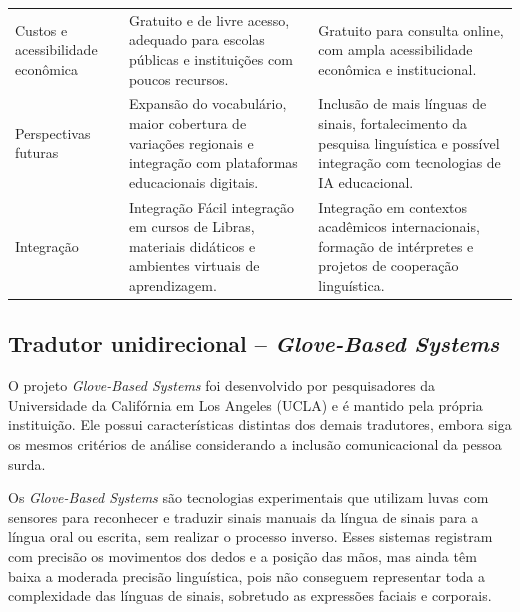 \documentclass[portuguese]{textolivre}
\begin{document}
\begin{table}[htbp]
\begin{threeparttable}
\begin{tabularx}{\textwidth}{@{}>{\raggedright\arraybackslash}p{2.5cm}
>{\raggedright\arraybackslash}X
>{\raggedright\arraybackslash}X@{}}
\addlinespace

Custos e acessibilidade econômica &
Gratuito e de livre acesso, adequado para escolas públicas e instituições com poucos recursos. &
Gratuito para consulta online, com ampla acessibilidade econômica e institucional. \\

\addlinespace

Perspectivas futuras &
Expansão do vocabulário, maior cobertura de variações regionais e integração com plataformas educacionais digitais. &
Inclusão de mais línguas de sinais, fortalecimento da pesquisa linguística e possível integração com tecnologias de IA educacional. \\

\addlinespace

Integração &
Integração Fácil integração em cursos de Libras, materiais didáticos e ambientes virtuais de aprendizagem. &
Integração em contextos acadêmicos internacionais, formação de intérpretes e projetos de cooperação linguística. \\

\bottomrule

\end{tabularx}
\end{threeparttable}
\end{table}

\subsection{Tradutor unidirecional – \textit{Glove-Based Systems}}

O projeto \textit{Glove-Based Systems} foi desenvolvido por pesquisadores da Universidade da Califórnia em Los Angeles (UCLA) e é mantido pela própria instituição. Ele possui características distintas dos demais tradutores, embora siga os mesmos critérios de análise considerando a inclusão comunicacional da pessoa surda.

Os \textit{Glove-Based Systems} são tecnologias experimentais que utilizam luvas com sensores para reconhecer e traduzir sinais manuais da língua de sinais para a língua oral ou escrita, sem realizar o processo inverso. Esses sistemas registram com precisão os movimentos dos dedos e a posição das mãos, mas ainda têm baixa a moderada precisão linguística, pois não conseguem representar toda a complexidade das línguas de sinais, sobretudo as expressões faciais e corporais.
\end{document}
